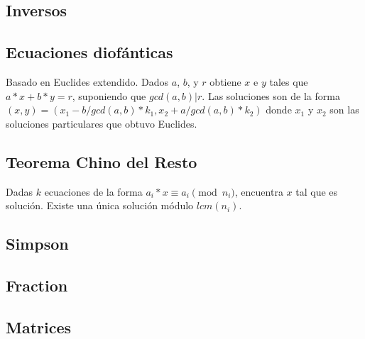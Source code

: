 {\subsection{Inversos}
\subsection{Ecuaciones diofánticas}
Basado en Euclides extendido. Dados $a$, $b$, y $r$ obtiene $x$ e $y$ tales que $a*x + b*y = r$, suponiendo que $gcd(a,b) | r$. Las soluciones son de la forma $(x, y) = (x_1 - b/gcd(a,b) * k_1, x_2 + a/gcd(a,b) * k_2)$ donde $x_1$ y $x_2$ son las soluciones particulares que obtuvo Euclides.
\subsection{Teorema Chino del Resto}
Dadas $k$ ecuaciones de la forma $a_i*x \equiv a_i \pmod {n_i}$, encuentra $x$ tal que es solución. Existe una única solución módulo $lcm(n_i)$.
\subsection{Simpson}
\subsection{Fraction}
%
%
%
%

\subsection{Matrices}
}
